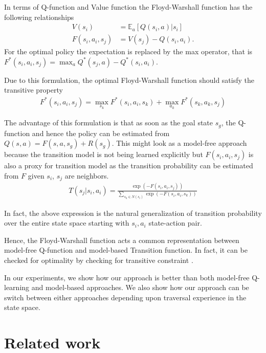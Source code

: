 \documentclass[letterpaper]{article} %
\def\state{s}
\def\act{a}
\def\Rew{R}
\def\E{\mathbb{E}}
\newcommand{\state}[2]{\mathbf{s}^{#1}(#2)}
\begin{document}
In terms of Q-function and Value function the Floyd-Warshall function has the following relationships
\begin{align}
V(\state_i) &= \E_{\act}[Q(\state_i, \act)|\state_i] \\
F(\state_i, \act_i, \state_j) &= V(\state_j) - Q(\state_i, \act_i).
\end{align}
For the optimal policy the expectation is replaced by the max operator, that is $F^*(\state_i, \act_i, \state_j) = \max_{\act} Q^*(\state_j, \act) - Q^*(\state_i, \act_i)$.

Due to this formulation, the optimal Floyd-Warshall function should satisfy the transitive property
\begin{align}
F^*(\state_i, \act_i, \state_j) = \max_{\state_k} F^*(\state_i, \act_i, \state_k)
+ \max_{\act_k}F^*(\state_k, \act_k, \state_j)
\label{eq:transitive-fw}
\end{align}

The advantage of this formulation is that as soon as the goal state $\state_g$, the Q-function and
hence the policy can be estimated from $Q(\state, \act) = F(\state, \act, \state_g) + \Rew(\state_g)$.
This might look as a model-free approach because the transition model is not being learned explicitly but $F(\state_i, \act_i, \state_j)$ is also a proxy for transition model as the transition probability can be estimated  from $F$ given $\state_i$, $\state_j$ are neighbors.
\begin{align}
T(\state_j | \state_i, \act_i) = \frac{\exp(-F(\state_i, \act_i, \state_j))}
{\sum_{\state_k \in N(\state_i)} \exp(-F(\state_i, \act_i, \state_k))}
\end{align}

In fact, the above expression is the natural generalization of transition probability over the entire state space starting with $\state_i, \act_i$ state-action pair.

Hence, the Floyd-Warshall function acts a common representation between model-free Q-function and
model-based Transition function. In fact, it can be checked for optimality by checking for
transitive constraint \label{eq:transitive-fw}.

In our experiments, we show how our approach is better than both model-free Q-learning and model-based approaches. We also show how our approach can be switch between either approaches depending upon traversal experience in the state space.


\section{Related work}
\end{document}
